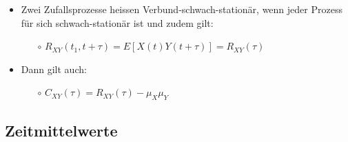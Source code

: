 \documentclass[10pt, a4paper]{article}
\begin{document}
\begin{itemize}
  \item Zwei Zufallsprozesse heissen Verbund-schwach-station\"ar, wenn jeder Prozess f\"ur sich 
        schwach-station\"ar ist und zudem gilt:  
        \begin{itemize}
          \item[$\circ$] $R_{XY}(t_{1},t+\tau) = E[X(t)Y(t+\tau)] = R_{XY}(\tau)$ 
        \end{itemize} 
  \item Dann gilt auch:
  \begin{itemize}
     \item[$\circ$] $C_{XY}(\tau) = R_{XY}(\tau) - \mu_{X} \mu_{Y}$
  \end{itemize} 
\end{itemize} 

\subsection{Zeitmittelwerte}
\end{document}
